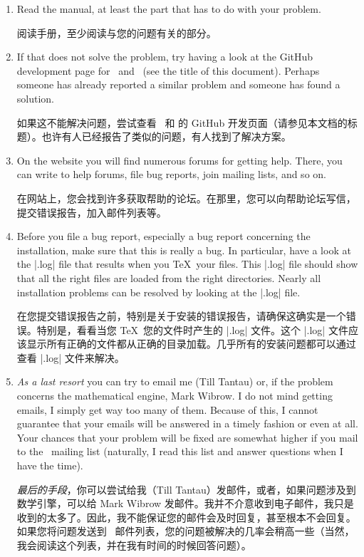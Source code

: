 \begin{enumerate}
    \item Read the manual, at least the part that has to do with your
        problem.

        阅读手册，至少阅读与您的问题有关的部分。
    \item If that does not solve the problem, try having a look at the
        GitHub development page for \pgfname\ and \tikzname\ (see the
        title of this document). Perhaps someone has already reported a
        similar problem and someone has found a solution.

        如果这不能解决问题，尝试查看 \pgfname\ 和 \tikzname 的 GitHub 开发页面（请参见本文档的标题）。也许有人已经报告了类似的问题，有人找到了解决方案。
    \item On the website you will find numerous forums for getting help.
        There, you can write to help forums, file bug reports, join mailing
        lists, and so on.

        在网站上，您会找到许多获取帮助的论坛。在那里，您可以向帮助论坛写信，提交错误报告，加入邮件列表等。
    \item Before you file a bug report, especially a bug report concerning
        the installation, make sure that this is really a bug. In particular,
        have a look at the |.log| file that results when you \TeX\ your
        files. This |.log| file should show that all the right files are
        loaded from the right directories. Nearly all installation problems
        can be resolved by looking at the |.log| file.

        在您提交错误报告之前，特别是关于安装的错误报告，请确保这确实是一个错误。特别是，看看当您 \TeX\ 您的文件时产生的 |.log| 文件。这个 |.log| 文件应该显示所有正确的文件都从正确的目录加载。几乎所有的安装问题都可以通过查看 |.log| 文件来解决。
    \item \emph{As a last resort} you can try to email me (Till Tantau) or,
        if the problem concerns the mathematical engine, Mark Wibrow. I do
        not mind getting emails, I simply get way too many of them. Because
        of this, I cannot guarantee that your emails will be answered in a 
        timely fashion or even at all. Your chances that your problem will
        be fixed are somewhat higher if you mail to the \pgfname\ mailing
        list (naturally, I read this list and answer questions when I have
        the time).

        \emph{最后的手段}，你可以尝试给我（Till Tantau）发邮件，或者，如果问题涉及到数学引擎，可以给 Mark Wibrow 发邮件。我并不介意收到电子邮件，我只是收到的太多了。因此，我不能保证您的邮件会及时回复，甚至根本不会回复。如果您将问题发送到 \pgfname\ 邮件列表，您的问题被解决的几率会稍高一些（当然，我会阅读这个列表，并在我有时间的时候回答问题）。
\end{enumerate}